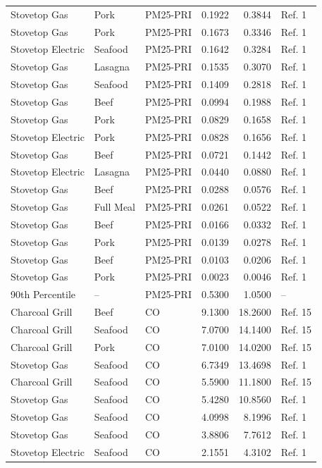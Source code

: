 \documentclass[
  11pt,
  oneside]{book}
\begin{document}
\begin{table}[H]
{\begin{tabular}[t]{lllrrl}
Stovetop Gas & Pork & PM25-PRI & 0.1922 & 0.3844 & Ref. 1\\
Stovetop Gas & Pork & PM25-PRI & 0.1673 & 0.3346 & Ref. 1\\
Stovetop Electric & Seafood & PM25-PRI & 0.1642 & 0.3284 & Ref. 1\\
Stovetop Gas & Lasagna & PM25-PRI & 0.1535 & 0.3070 & Ref. 1\\
\addlinespace
Stovetop Gas & Seafood & PM25-PRI & 0.1409 & 0.2818 & Ref. 1\\
Stovetop Gas & Beef & PM25-PRI & 0.0994 & 0.1988 & Ref. 1\\
Stovetop Gas & Pork & PM25-PRI & 0.0829 & 0.1658 & Ref. 1\\
Stovetop Electric & Pork & PM25-PRI & 0.0828 & 0.1656 & Ref. 1\\
Stovetop Gas & Beef & PM25-PRI & 0.0721 & 0.1442 & Ref. 1\\
\addlinespace
Stovetop Electric & Lasagna & PM25-PRI & 0.0440 & 0.0880 & Ref. 1\\
Stovetop Gas & Beef & PM25-PRI & 0.0288 & 0.0576 & Ref. 1\\
Stovetop Gas & Full Meal & PM25-PRI & 0.0261 & 0.0522 & Ref. 1\\
Stovetop Gas & Beef & PM25-PRI & 0.0166 & 0.0332 & Ref. 1\\
Stovetop Gas & Pork & PM25-PRI & 0.0139 & 0.0278 & Ref. 1\\
\addlinespace
Stovetop Gas & Beef & PM25-PRI & 0.0103 & 0.0206 & Ref. 1\\
Stovetop Gas & Pork & PM25-PRI & 0.0023 & 0.0046 & Ref. 1\\
90th Percentile & -- & PM25-PRI & 0.5300 & 1.0500 & --\\
Charcoal Grill & Beef & CO & 9.1300 & 18.2600 & Ref. 15\\
Charcoal Grill & Seafood & CO & 7.0700 & 14.1400 & Ref. 15\\
\addlinespace
Charcoal Grill & Pork & CO & 7.0100 & 14.0200 & Ref. 15\\
Stovetop Gas & Seafood & CO & 6.7349 & 13.4698 & Ref. 1\\
Charcoal Grill & Seafood & CO & 5.5900 & 11.1800 & Ref. 15\\
Stovetop Gas & Seafood & CO & 5.4280 & 10.8560 & Ref. 1\\
Stovetop Gas & Seafood & CO & 4.0998 & 8.1996 & Ref. 1\\
\addlinespace
Stovetop Gas & Seafood & CO & 3.8806 & 7.7612 & Ref. 1\\
Stovetop Electric & Seafood & CO & 2.1551 & 4.3102 & Ref. 1\\

\end{tabular}}
\end{table}
\end{document}
